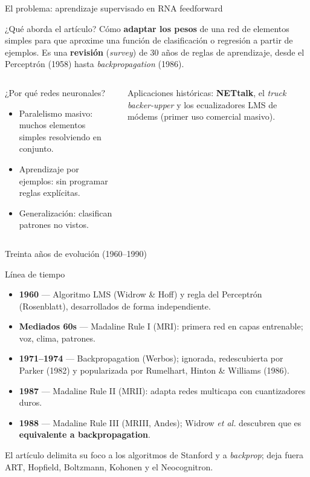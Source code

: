 \documentclass[aspectratio=169, 11pt, xcolor={dvipsnames,table}]{beamer}
\newcommand{\azul}[1]{\textcolor{UsachAzul}{#1}}
\newcommand{\naranja}[1]{\textcolor{UsachNaranja}{#1}}
\begin{document}
\begin{frame}{El problema: aprendizaje supervisado en RNA feedforward}
\begin{block}{¿Qué aborda el artículo?}
Cómo \textbf{adaptar los pesos} de una red de elementos simples para que aproxime una función de
\azul{clasificación} o \azul{regresión} a partir de ejemplos. Es una \textbf{revisión} (\emph{survey})
de 30 años de reglas de aprendizaje, desde el Perceptrón (1958) hasta \emph{backpropagation} (1986).
\end{block}
\begin{columns}[T]
\begin{block}{¿Por qué redes neuronales?}
\begin{itemize}
  \item \naranja{Paralelismo masivo}: muchos elementos simples resolviendo en conjunto.
  \item \naranja{Aprendizaje por ejemplos}: sin programar reglas explícitas.
  \item \naranja{Generalización}: clasifican patrones no vistos.
\end{itemize}
\end{block}
\begin{tipbox}
Aplicaciones históricas: \textbf{NETtalk}, el \emph{truck backer-upper} y los ecualizadores LMS
de módems (primer uso comercial masivo).
\end{tipbox}
\end{columns}
\end{frame}

\begin{frame}{Treinta años de evolución (1960--1990)}
\begin{block}{Línea de tiempo}
\begin{itemize}
  \item \textbf{1960} --- Algoritmo \azul{LMS} (Widrow \& Hoff) y regla del \azul{Perceptrón} (Rosenblatt), desarrollados de forma independiente.
  \item \textbf{Mediados 60s} --- \azul{Madaline Rule I} (MRI): primera red en capas entrenable; voz, clima, patrones.
  \item \textbf{1971--1974} --- \azul{Backpropagation} (Werbos); ignorada, redescubierta por Parker (1982) y popularizada por Rumelhart, Hinton \& Williams (1986).
  \item \textbf{1987} --- \azul{Madaline Rule II} (MRII): adapta redes multicapa con cuantizadores duros.
  \item \textbf{1988} --- \azul{Madaline Rule III} (MRIII, Andes); Widrow \emph{et al.} descubren que es \textbf{equivalente a backpropagation}.
\end{itemize}
\end{block}
\begin{tipbox}
El artículo delimita su foco a los algoritmos de Stanford y a \emph{backprop}; deja fuera ART,
Hopfield, Boltzmann, Kohonen y el Neocognitron.
\end{tipbox}
\end{frame}
\end{document}
